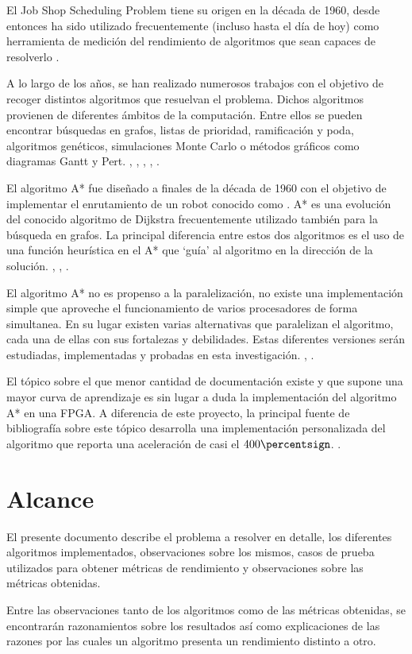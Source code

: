 El Job Shop Scheduling Problem tiene su origen en la década de 1960,
desde entonces ha sido utilizado frecuentemente (incluso hasta el día de hoy)
como herramienta de medición del rendimiento de algoritmos que sean 
capaces de resolverlo \cite{Man67}.

A lo largo de los años, se han realizado numerosos trabajos con el objetivo
de recoger distintos algoritmos que resuelvan el problema.
Dichos algoritmos provienen de diferentes ámbitos de la computación.
Entre ellos se pueden encontrar búsquedas en grafos,
listas de prioridad, ramificación y poda, algoritmos genéticos,
simulaciones Monte Carlo o
métodos gráficos como diagramas Gantt y Pert.
\cite{Yan77}, \cite{Nil69}, \cite{KTM99}, \cite{BC22}, \cite{Pin08}.

El algoritmo A* fue diseñado a finales de la década de 1960
con el objetivo de implementar el enrutamiento de un robot
conocido como  \cite{Nil84}.
A* es una evolución del conocido algoritmo de Dijkstra
frecuentemente utilizado también para la búsqueda en grafos.
La principal diferencia entre estos dos algoritmos es el
uso de una función heurística en el A* que `guía' al algoritmo
en la dirección de la solución.
\cite{HNR68}, \cite{MSV13}, \cite{Kon14}.

El algoritmo A* no es propenso a la paralelización,
no existe una implementación simple que aproveche el funcionamiento de
varios procesadores de forma simultanea.
En su lugar existen varias alternativas que paralelizan el algoritmo,
cada una de ellas con sus fortalezas y debilidades.
Estas diferentes versiones serán estudiadas, implementadas y
probadas en esta investigación.
\cite{Zag17}, \cite{WH16}.

El tópico sobre el que menor cantidad de documentación existe
y que supone una mayor curva de aprendizaje es sin lugar a duda
la implementación del algoritmo A* en una FPGA.
A diferencia de este proyecto, la principal fuente de bibliografía
sobre este tópico desarrolla una implementación personalizada del algoritmo
que reporta una aceleración de casi el $400\percentsign$.
\cite{ZJW20}.

\pagebreak

\section{Alcance}

El presente documento describe el problema a resolver en detalle,
los diferentes algoritmos implementados,
observaciones sobre los mismos,
casos de prueba utilizados para obtener métricas de rendimiento
y observaciones sobre las métricas obtenidas.

Entre las observaciones tanto de los algoritmos como de las métricas
obtenidas, se encontrarán razonamientos sobre los resultados así
como explicaciones de las razones por las cuales un algoritmo
presenta un rendimiento distinto a otro.
